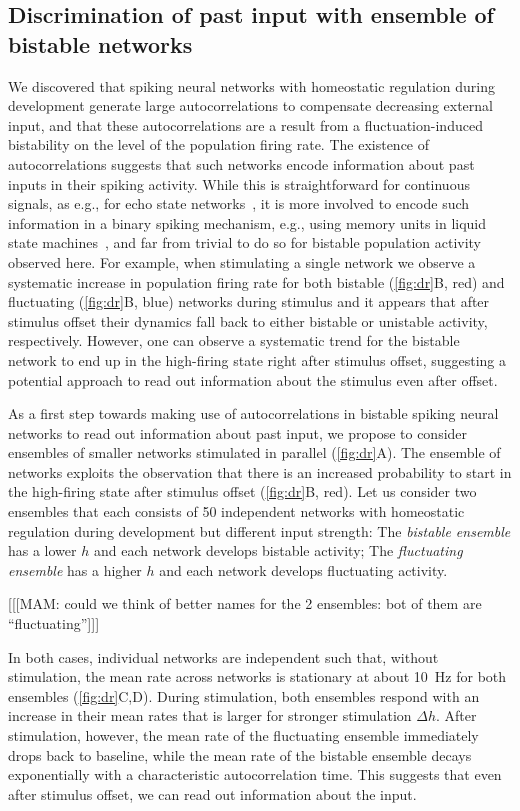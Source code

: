 \subsection{Discrimination of past input with ensemble of bistable networks}
We discovered that spiking neural networks with homeostatic regulation during development generate large autocorrelations to compensate decreasing external input, and that these autocorrelations are a result from a fluctuation-induced bistability on the level of the population firing rate.
The existence of autocorrelations suggests that such networks encode information about past inputs in their spiking activity.
While this is straightforward for continuous signals, as e.g., for echo state networks~\cite{jaeger_echo_2001}, it is more involved to encode such information in a binary spiking mechanism, e.g., using memory units in liquid state machines~\cite{maass_real-time_2002}, and far from trivial to do so for bistable population activity observed here.
For example, when stimulating a single network we observe a systematic increase in population firing rate for both bistable (\cref{fig:dr}B, red) and fluctuating (\cref{fig:dr}B, blue) networks during stimulus and it appears that after stimulus offset their dynamics fall back to either bistable or unistable activity, respectively.
However, one can observe a systematic trend for the bistable network to end up in the high-firing state right after stimulus offset, suggesting a potential approach to read out information about the stimulus even after offset.

As a first step towards making use of autocorrelations in bistable spiking neural networks to read out information about past input, we propose to consider ensembles of smaller networks stimulated in parallel (\cref{fig:dr}A).
The ensemble of networks exploits the observation that there is an increased probability to start in the high-firing state after stimulus offset (\cref{fig:dr}B, red).
Let us consider two ensembles that each consists of \num{50} independent networks with homeostatic regulation during development but different input strength:
The \textit{bistable ensemble} has a lower $h$ and each network develops bistable activity;
The \textit{fluctuating ensemble} has a higher $h$ and each network develops fluctuating activity.

[[[MAM: could we think of better names for the 2 ensembles: bot of them are ``fluctuating'']]]

In both cases, individual networks are independent such that, without stimulation, the mean rate across networks is stationary at about \SI{10}{\hertz} for both ensembles (\cref{fig:dr}C,D).
During stimulation, both ensembles respond with an increase in their mean rates that is larger for stronger stimulation $\Delta h$.
After stimulation, however, the mean rate of the fluctuating ensemble immediately drops back to baseline, while the mean rate of the bistable ensemble decays exponentially with a characteristic autocorrelation time.
This suggests that even after stimulus offset, we can read out information about the input.

